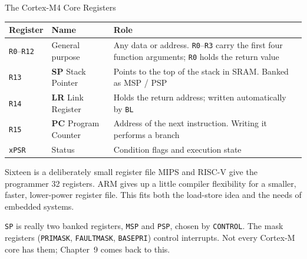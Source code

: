 \documentclass[9pt,aspectratio=169,xcolor=table]{beamer}
\newcommand{\striped}{\rowcolors{1}{white}{stripe}}
\begin{document}
\begin{frame}{The Cortex-M4 Core Registers}
	\begin{center}
		{\small
			\striped
			\begin{tabular}{@{}l l R{.52\textwidth}@{}}
				\toprule
				\textbf{Register} & \textbf{Name} & \textbf{Role} \\
				\midrule
				\texttt{R0}--\texttt{R12} & General purpose
				& Any data or address. \texttt{R0}--\texttt{R3} carry the first four
				function arguments; \texttt{R0} holds the return value \\
				\texttt{R13} & \textbf{SP} Stack Pointer
				& Points to the top of the stack in SRAM. Banked as MSP / PSP \\
				\texttt{R14} & \textbf{LR} Link Register
				& Holds the return address; written automatically by \texttt{BL} \\
				\texttt{R15} & \textbf{PC} Program Counter
				& Address of the next instruction. Writing it performs a branch \\
				\midrule
				\texttt{xPSR} & Status & Condition flags and execution state \\
				\bottomrule
		\end{tabular}}
	\end{center}
	\vspace{2mm}
	\begin{block}{Sixteen is a deliberately small register file}
		MIPS and RISC-V give the programmer 32 registers. ARM gives up a little compiler flexibility for a smaller, faster, lower-power register file. This fits both the load-store idea and the needs of embedded systems.
	\end{block}
	\vspace{1mm}
	{\small \texttt{SP} is really two banked registers, \texttt{MSP} and \texttt{PSP}, chosen by \texttt{CONTROL}. The mask registers (\texttt{PRIMASK}, \texttt{FAULTMASK}, \texttt{BASEPRI}) control interrupts. Not every Cortex-M core has them; Chapter~9 comes back to this.}
\end{frame}
\end{document}
